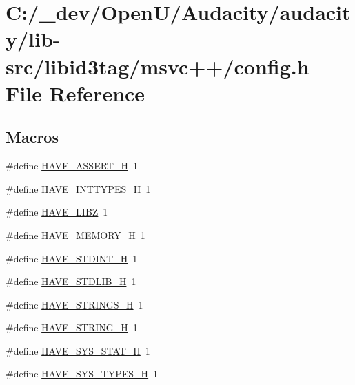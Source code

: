 \hypertarget{lib-src_2libid3tag_2msvc_09_09_2config_8h}{}\section{C\+:/\+\_\+dev/\+Open\+U/\+Audacity/audacity/lib-\/src/libid3tag/msvc++/config.h File Reference}
\label{lib-src_2libid3tag_2msvc_09_09_2config_8h}
\subsection*{Macros}
\begin{DoxyCompactItemize}
\item 
\#define \hyperlink{lib-src_2libid3tag_2msvc_09_09_2config_8h_ad0eabe2e5407bc73450eb15b657983cd}{H\+A\+V\+E\+\_\+\+A\+S\+S\+E\+R\+T\+\_\+H}~1
\item 
\#define \hyperlink{lib-src_2libid3tag_2msvc_09_09_2config_8h_ab90a030ff2790ebdc176660a6dd2a478}{H\+A\+V\+E\+\_\+\+I\+N\+T\+T\+Y\+P\+E\+S\+\_\+H}~1
\item 
\#define \hyperlink{lib-src_2libid3tag_2msvc_09_09_2config_8h_ab52774670674c949e48837976b331e33}{H\+A\+V\+E\+\_\+\+L\+I\+BZ}~1
\item 
\#define \hyperlink{lib-src_2libid3tag_2msvc_09_09_2config_8h_ae93a78f9d076138897af441c9f86f285}{H\+A\+V\+E\+\_\+\+M\+E\+M\+O\+R\+Y\+\_\+H}~1
\item 
\#define \hyperlink{lib-src_2libid3tag_2msvc_09_09_2config_8h_ab6cd6d1c63c1e26ea2d4537b77148354}{H\+A\+V\+E\+\_\+\+S\+T\+D\+I\+N\+T\+\_\+H}~1
\item 
\#define \hyperlink{lib-src_2libid3tag_2msvc_09_09_2config_8h_a9e0e434ec1a6ddbd97db12b5a32905e0}{H\+A\+V\+E\+\_\+\+S\+T\+D\+L\+I\+B\+\_\+H}~1
\item 
\#define \hyperlink{lib-src_2libid3tag_2msvc_09_09_2config_8h_a405d10d46190bcb0320524c54eafc850}{H\+A\+V\+E\+\_\+\+S\+T\+R\+I\+N\+G\+S\+\_\+H}~1
\item 
\#define \hyperlink{lib-src_2libid3tag_2msvc_09_09_2config_8h_ad4c234dd1625255dc626a15886306e7d}{H\+A\+V\+E\+\_\+\+S\+T\+R\+I\+N\+G\+\_\+H}~1
\item 
\#define \hyperlink{lib-src_2libid3tag_2msvc_09_09_2config_8h_ace156430ba007d19b4348a950d0c692b}{H\+A\+V\+E\+\_\+\+S\+Y\+S\+\_\+\+S\+T\+A\+T\+\_\+H}~1
\item 
\#define \hyperlink{lib-src_2libid3tag_2msvc_09_09_2config_8h_a69dc70bea5d1f8bd2be9740e974fa666}{H\+A\+V\+E\+\_\+\+S\+Y\+S\+\_\+\+T\+Y\+P\+E\+S\+\_\+H}~1

\end{DoxyCompactItemize}

